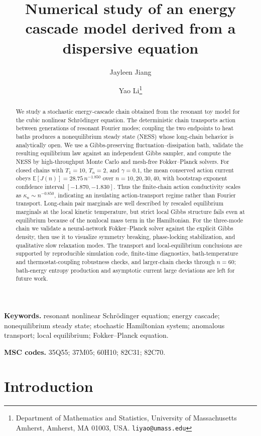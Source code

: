 \documentclass[11pt,a4paper]{article}
\title{Numerical study of an energy cascade model derived from a dispersive equation}
\author{Jayleen Jiang \and Yao Li\thanks{Department of Mathematics and Statistics, University of Massachusetts Amherst, Amherst, MA 01003, USA. \texttt{liyao@umass.edu}}}
\date{}
\theoremstyle{definition}
\newcommand{\E}{\mathbb{E}}
\numberwithin{equation}{section}   %
\begin{document}
\maketitle
\linenumbers

\begin{abstract}
We study a stochastic energy-cascade chain obtained from the resonant toy model
for the cubic nonlinear Schr\"odinger equation. The deterministic chain
transports action between generations of resonant Fourier modes; coupling the
two endpoints to heat baths produces a nonequilibrium steady state (NESS) whose
long-chain behavior is analytically open. We use a Gibbs-preserving
fluctuation--dissipation bath, validate the resulting equilibrium law against
an independent Gibbs sampler, and compute the NESS by high-throughput Monte
Carlo and mesh-free Fokker--Planck solvers. For closed chains with
$T_1=10$, $T_n=2$, and $\gamma=0.1$, the mean conserved action current obeys
$\E[J(n)]=28.75\,n^{-1.850}$ over $n=10,20,30,40$, with bootstrap exponent
confidence interval $[-1.870,-1.830]$. Thus the finite-chain action
conductivity scales as $\kappa_n\sim n^{-0.850}$, indicating an insulating
action-transport regime rather than Fourier transport. Long-chain pair
marginals are well described by rescaled equilibrium marginals at the local
kinetic temperature, but strict local Gibbs structure fails even at
equilibrium because of the nonlocal mass term in the Hamiltonian. For the
three-mode chain we validate a neural-network Fokker--Planck solver against the
explicit Gibbs density, then use it to visualize symmetry breaking,
phase-locking stabilization, and qualitative slow relaxation modes. The
transport and local-equilibrium conclusions are supported by reproducible
simulation code, finite-time diagnostics, bath-temperature and
thermostat-coupling robustness checks, and larger-chain checks through $n=60$;
bath-energy entropy production and asymptotic current large deviations are
left for future work.
\end{abstract}

\noindent\textbf{Keywords.}
resonant nonlinear Schr\"odinger equation; energy cascade; nonequilibrium
steady state; stochastic Hamiltonian system; anomalous transport; local
equilibrium; Fokker--Planck equation.

\medskip
\noindent\textbf{MSC codes.}
35Q55; 37M05; 60H10; 82C31; 82C70.


\section{Introduction}
\end{document}
